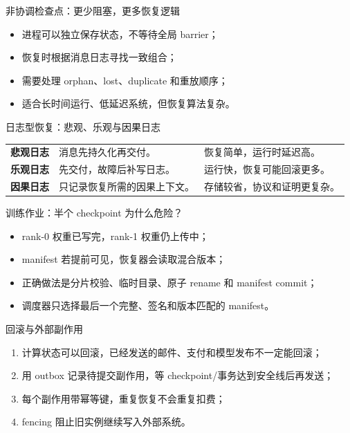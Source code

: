 \documentclass[UTF8,fontset=none,aspectratio=169,10pt]{beamer}
\begin{document}
\begin{frame}{非协调检查点：更少阻塞，更多恢复逻辑}
\begin{itemize}
  \item 进程可以独立保存状态，不等待全局 barrier；
  \item 恢复时根据消息日志寻找一致组合；
  \item 需要处理 orphan、lost、duplicate 和重放顺序；
  \item 适合长时间运行、低延迟系统，但恢复算法复杂。
\end{itemize}
\end{frame}

\begin{frame}{日志型恢复：悲观、乐观与因果日志}
\begin{tabularx}{\linewidth}{>{\bfseries}p{3cm}XX}
\toprule
悲观日志 & 消息先持久化再交付。 & 恢复简单，运行时延迟高。 \\
乐观日志 & 先交付，故障后补写日志。 & 运行快，恢复可能回滚更多。 \\
因果日志 & 只记录恢复所需的因果上下文。 & 存储较省，协议和证明更复杂。 \\
\bottomrule
\end{tabularx}
\end{frame}

\begin{frame}{训练作业：半个 checkpoint 为什么危险？}
\begin{itemize}
  \item rank-0 权重已写完，rank-1 权重仍上传中；
  \item manifest 若提前可见，恢复器会读取混合版本；
  \item 正确做法是分片校验、临时目录、原子 rename 和 manifest commit；
  \item 调度器只选择最后一个完整、签名和版本匹配的 manifest。
\end{itemize}
\end{frame}

\begin{frame}{回滚与外部副作用}
\begin{enumerate}
  \item 计算状态可以回滚，已经发送的邮件、支付和模型发布不一定能回滚；
  \item 用 outbox 记录待提交副作用，等 checkpoint/事务达到安全线后再发送；
  \item 每个副作用带幂等键，重复恢复不会重复扣费；
  \item fencing 阻止旧实例继续写入外部系统。
\end{enumerate}
\end{frame}
\end{document}
